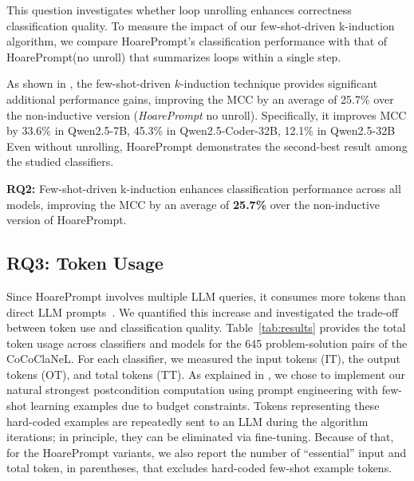 \documentclass[sigconf]{acmart}
\newcommand{\projName}{HoarePrompt\xspace}
\newcommand{\benchName}{CoCoClaNeL\xspace}
\begin{document}
This question investigates whether loop unrolling  enhances correctness classification quality. To measure the impact of our few-shot-driven k-induction algorithm, we compare \projName's classification performance with that of \projName (no unroll) that summarizes loops within a single step.

As shown in , the few-shot-driven $k$-induction technique provides significant additional performance gains, improving the MCC by an average of 25.7\% over the non-inductive version (\textit{\projName} no unroll). Specifically, it improves MCC by 33.6\% in Qwen2.5-7B, 45.3\% in Qwen2.5-Coder-32B, 12.1\% in Qwen2.5-32B   Even without unrolling, \projName demonstrates the second-best result among the studied classifiers.

\begin{tcolorbox}[colback=gray!5, colframe=black!20, arc=2pt, boxrule=0.3mm, breakable, sharp corners, left=2pt, right=2pt, top=2pt, bottom=2pt]
\textbf{RQ2:} Few-shot-driven k-induction enhances classification performance across all models, improving the MCC by an average of \textbf{25.7\%} over the non-inductive version of \projName.
\end{tcolorbox}


\subsection{RQ3: Token Usage}

Since \projName involves multiple LLM queries, it consumes more tokens than direct LLM prompts~\cite{liu2024groupdebate}. We quantified this increase and investigated the trade-off between token use and classification quality. Table~\ref{tab:results} provides the total token usage across classifiers and models for the 645 problem-solution pairs of the \benchName. For each classifier, we measured the input tokens (IT), the output tokens (OT), and total tokens (TT). As explained in , we chose to implement our natural strongest postcondition computation using prompt engineering with few-shot learning examples due to budget constraints. Tokens representing these hard-coded examples are repeatedly sent to an LLM during the algorithm iterations; in principle, they can be eliminated via fine-tuning. Because of that,  for the \projName variants, we also report the number of ``essential'' input and total token, in parentheses, that excludes hard-coded few-shot example tokens.
\end{document}
